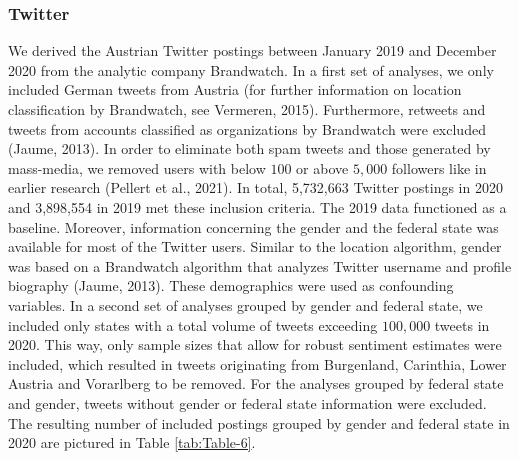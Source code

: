 \documentclass[
  english,
  jou,floatsintext]{apa7}
\begin{document}
\hypertarget{twitter}{%
\subsubsection{Twitter}\label{twitter}}

We derived the Austrian Twitter postings between January 2019 and December 2020 from the analytic company Brandwatch. In a first set of analyses, we only included German tweets from Austria (for further information on location classification by Brandwatch, see Vermeren, 2015). Furthermore, retweets and tweets from accounts classified as organizations by Brandwatch were excluded (Jaume, 2013). In order to eliminate both spam tweets and those generated by mass-media, we removed users with below \(100\) or above \(5,000\) followers like in earlier research (Pellert et al., 2021). In total, 5,732,663 Twitter postings in 2020 and 3,898,554 in 2019 met these inclusion criteria. The 2019 data functioned as a baseline. Moreover, information concerning the gender and the federal state was available for most of the Twitter users. Similar to the location algorithm, gender was based on a Brandwatch algorithm that analyzes Twitter username and profile biography (Jaume, 2013). These demographics were used as confounding variables. In a second set of analyses grouped by gender and federal state, we included only states with a total volume of tweets exceeding \(100,000\) tweets in 2020. This way, only sample sizes that allow for robust sentiment estimates were included, which resulted in tweets originating from Burgenland, Carinthia, Lower Austria and Vorarlberg to be removed. For the analyses grouped by federal state and gender, tweets without gender or federal state information were excluded. The resulting number of included postings grouped by gender and federal state in 2020 are pictured in Table \ref{tab:Table-6}.
\end{document}
